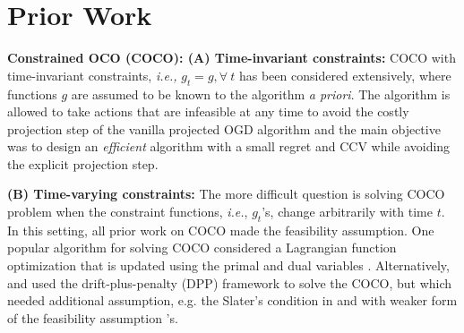 \section{Prior Work}
{\bf Constrained OCO (COCO): (A) Time-invariant constraints:} COCO with time-invariant constraints, \emph{i.e.,} $g_{t} = g, \forall \ t$ \citep{yuan2018online, jenatton2016adaptive, mahdavi2012trading, yi2021regret} has been considered extensively, where functions $g$ are assumed to be known to the algorithm \emph{a priori}. The algorithm is allowed to take actions that are infeasible at any time to avoid the costly projection step of the vanilla projected OGD algorithm and the main objective was to design an \emph{efficient} algorithm  with a small regret and CCV while avoiding  the explicit projection step. 

{\bf (B) Time-varying constraints:} The more difficult question is solving COCO problem when the constraint functions, \emph{i.e.}, $g_{t}$'s, change arbitrarily with time $t$.  
In this setting, all prior work on COCO made the feasibility assumption.
One popular algorithm for solving COCO considered a Lagrangian function optimization that is updated using the primal and dual variables \citep{yu2017online, pmlr-v70-sun17a, yi2023distributed}. Alternatively, \citet{neely2017online} and \cite{georgios-cautious} used the drift-plus-penalty (DPP) framework  \citet{neely2010stochastic} to solve the COCO, but which needed additional assumption, e.g. the Slater's condition in \citet{neely2017online} and with weaker form of the feasibility assumption \cite{neely2017online}'s. 

